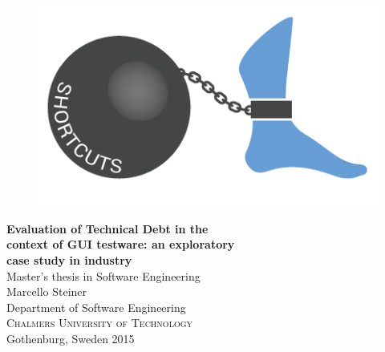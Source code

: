 
\begin{titlepage}

\addtolength{\voffset}{2cm}

\begin{figure}[h]
\centering
\includegraphics[width=\textwidth]{figure/auxiliary/td.png}
\end{figure}

\mbox{}
\vfill
\renewcommand{\familydefault}{\sfdefault} \normalfont %
\textbf{{\Huge 	Evaluation of Technical Debt in the  	\\[0.2cm]
                context of GUI testware: an exploratory \\[0.2cm]
				case study in industry}} 	\\[0.5cm]
Master's thesis in Software Engineering \\[0.5cm]

{\Large Marcello Steiner}\\[2.5cm]

Department of Software Engineering \\
\textsc{Chalmers University of Technology} \\
Gothenburg, Sweden 2015

\renewcommand{\familydefault}{\rmdefault} \normalfont %
\end{titlepage}


